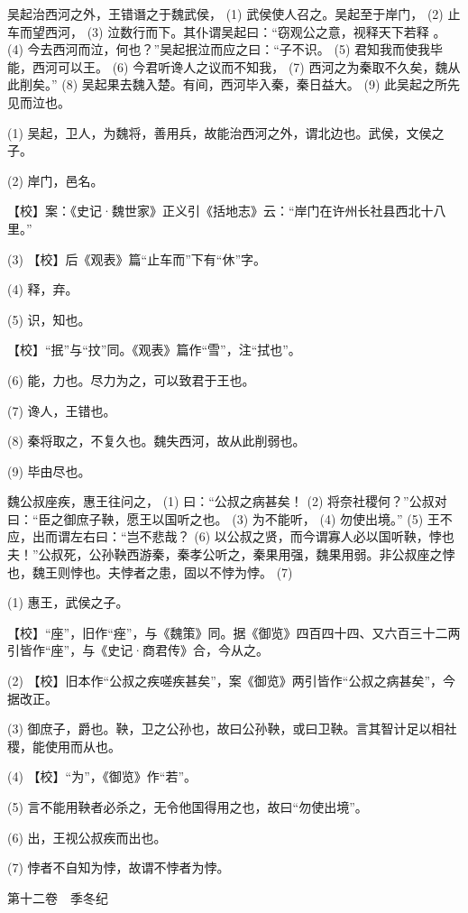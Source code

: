 \documentclass[12pt,UTF8]{ctexbook}
\begin{document}
吴起治西河之外，王错谮之于魏武侯， (1) 武侯使人召之。吴起至于岸门， (2) 止车而望西河， (3) 泣数行而下。其仆谓吴起曰：“窃观公之意，视释天下若释 。 (4) 今去西河而泣，何也？”吴起抿泣而应之曰：“子不识。 (5) 君知我而使我毕能，西河可以王。 (6) 今君听谗人之议而不知我， (7) 西河之为秦取不久矣，魏从此削矣。” (8) 吴起果去魏入楚。有间，西河毕入秦，秦日益大。 (9) 此吴起之所先见而泣也。

(1) 吴起，卫人，为魏将，善用兵，故能治西河之外，谓北边也。武侯，文侯之子。

(2) 岸门，邑名。

【校】案：《史记·魏世家》正义引《括地志》云：“岸门在许州长社县西北十八里。”

(3) 【校】后《观表》篇“止车而”下有“休”字。

(4) 释，弃。

(5) 识，知也。

【校】“抿”与“抆”同。《观表》篇作“雪”，注“拭也”。

(6) 能，力也。尽力为之，可以致君于王也。

(7) 谗人，王错也。

(8) 秦将取之，不复久也。魏失西河，故从此削弱也。

(9) 毕由尽也。

魏公叔座疾，惠王往问之， (1) 曰：“公叔之病甚矣！ (2) 将奈社稷何？”公叔对曰：“臣之御庶子鞅，愿王以国听之也。 (3) 为不能听， (4) 勿使出境。” (5) 王不应，出而谓左右曰：“岂不悲哉？ (6) 以公叔之贤，而今谓寡人必以国听鞅，悖也夫！”公叔死，公孙鞅西游秦，秦孝公听之，秦果用强，魏果用弱。非公叔座之悖也，魏王则悖也。夫悖者之患，固以不悖为悖。 (7)

(1) 惠王，武侯之子。

【校】“座”，旧作“痤”，与《魏策》同。据《御览》四百四十四、又六百三十二两引皆作“座”，与《史记·商君传》合，今从之。

(2) 【校】旧本作“公叔之疾嗟疾甚矣”，案《御览》两引皆作“公叔之病甚矣”，今据改正。

(3) 御庶子，爵也。鞅，卫之公孙也，故曰公孙鞅，或曰卫鞅。言其智计足以相社稷，能使用而从也。

(4) 【校】“为”，《御览》作“若”。

(5) 言不能用鞅者必杀之，无令他国得用之也，故曰“勿使出境”。

(6) 出，王视公叔疾而出也。

(7) 悖者不自知为悖，故谓不悖者为悖。





第十二卷　季冬纪
\end{document}

